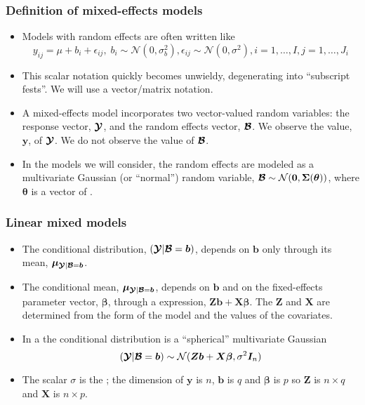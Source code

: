 \begin{frame}[fragile]
  \frametitle{Definition of mixed-effects models}
  \begin{itemize}
  \item Models with random effects are often written like
    \begin{displaymath}
      y_{ij}=\mu+b_i+\epsilon_{ij},\;
      b_i\sim\mathcal{N}(0,\sigma_b^2),
      \epsilon_{ij}\sim\mathcal{N}(0,\sigma^2),i=1,\dots,I,j=1,\dots,J_i
    \end{displaymath}
  \item This scalar notation quickly becomes unwieldy, degenerating
    into ``subscript fests''. We will use a vector/matrix notation.
  \item A mixed-effects model incorporates two vector-valued random
    variables: the response vector, $\bm{\mathcal{Y}}$, and the random effects
    vector, $\bm{\mathcal{B}}$. We observe the value, $\bm y$, of $\bm{\mathcal{Y}}$.  We
    do not observe the value of $\bm{\mathcal{B}}$.
  \item In the models we will consider, the random effects are modeled
    as a multivariate Gaussian (or ``normal'') random variable,
    $\bm{\mathcal{B}}\sim\mathcal{N}(\bm 0,\bm\Sigma(\bm\theta))$, where
    $\bm\theta$ is a vector of .
  \end{itemize}
\end{frame}

\begin{frame}
  \frametitle{Linear mixed models}
  \begin{itemize}
  \item The conditional distribution, $(\bm{\mathcal{Y}}|\bm{\mathcal{B}}=\bm b)$, depends on
    $\bm b$ only through its mean, $\bm\mu_{\bm{\mathcal{Y}}|\bm{\mathcal{B}}=\bm b}$.
  \item The conditional mean, $\bm\mu_{\bm{\mathcal{Y}}|\bm{\mathcal{B}}=\bm b}$, depends on
    $\bm b$ and on the fixed-effects parameter vector, $\bm\beta$, through a
     expression, $\bm Z\bm b+\bm X\bm\beta$.
    The  $\bm Z$ and $\bm X$ are determined from the
    form of the model and the values of the covariates.
  \item In a  the conditional distribution is
    a ``spherical'' multivariate Gaussian
    \begin{displaymath}
      (\bm{\mathcal{Y}}|\bm{\mathcal{B}}=\bm b)\sim\mathcal{N}(\bm Z\bm b+\bm X\bm\beta,
      \sigma^2\bm I_n)
    \end{displaymath}
  \item The scalar $\sigma$ is the ; the
    dimension of $\bm y$ is $n$, $\bm b$ is $q$ and $\bm\beta$ is $p$
    so $\bm Z$ is $n\times q$ and $\bm X$ is $n\times p$.
  \end{itemize}
\end{frame}

